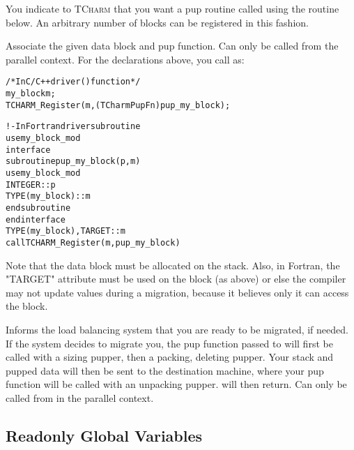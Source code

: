 \documentclass[10pt]{article}
\newcommand{\tcharm}{\textsc{TCharm}}
\begin{document}
You indicate to \tcharm{} that you want a pup routine called using
the routine below.  An arbitrary number of blocks can be registered
in this fashion.

\vspace{0.2in}

     Associate the given data block and pup function.  Can only be
     called from the parallel context.  For the declarations above, you call
      as:

\begin{alltt}
          /*In C/C++ driver() function*/
          my_block m;
          TCHARM_Register(m,(TCharmPupFn)pup_my_block);
 
          !- In Fortran driver subroutine
          use my_block_mod
          interface
            subroutine pup_my_block(p,m)
              use my_block_mod
              INTEGER :: p
              TYPE(my_block) :: m
            end subroutine
          end interface
          TYPE(my_block), TARGET :: m
          call TCHARM_Register(m,pup_my_block)
\end{alltt}

     Note that the data block must be allocated on the stack. 
     Also, in Fortran, the "TARGET" attribute must be used on the 
     block (as above) or else the compiler may not update values during 
     a migration, because it believes only it can access the block.

\vspace{0.2in}

     Informs the load balancing system that you are ready to be
     migrated, if needed.  If the system decides to migrate you, the
     pup function passed to  will first be called with 
     a sizing pupper, then a packing, deleting pupper.  Your stack and pupped
     data will then be sent to the destination machine, where your pup
     function will be called with an unpacking pupper.  
     will then return.  Can only be called from in the parallel context.



\subsection{Readonly Global Variables}
\label{sec:readonlyglobal}
\end{document}
